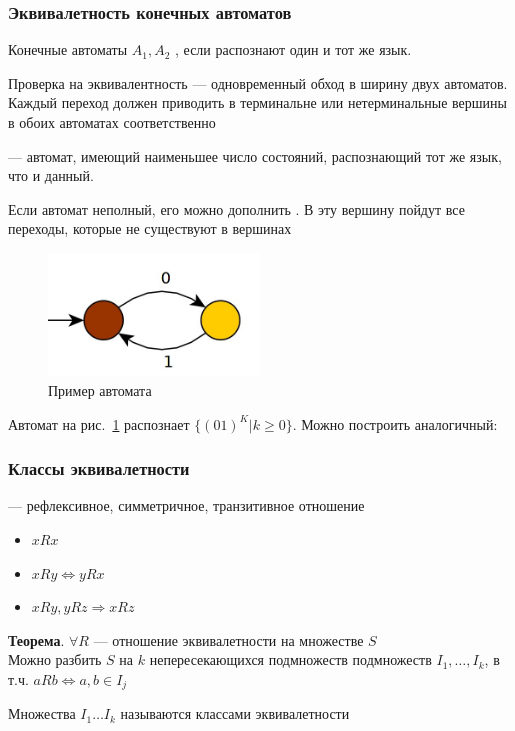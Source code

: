 \documentclass[a4paper, 14pt]{extarticle}
\begin{document}
\subsubsection{Эквивалетность конечных автоматов}
Конечные автоматы $A_1, A_2$ , если распознают один и тот же язык.

Проверка на эквивалентность --- одновременный обход в ширину двух автоматов. Каждый переход должен приводить в терминальне или нетерминальные вершины в обоих автоматах соответственно

 --- автомат, имеющий наименьшее число состояний, распознающий тот же язык, что и данный. 

Если автомат неполный, его можно дополнить . В эту вершину пойдут все переходы, которые не существуют в вершинах  

\begin{figure}[h]
    \centering
    \includegraphics[width=0.5\textwidth]{./img/L2/S001.jpg}
    \caption{Пример автомата}%
    \label{img:l2:1}
\end{figure}
Автомат на рис.~\ref{img:l2:1} распознает $\{ {(01)}^K | k \ge 0 \}$. Можно построить аналогичный:

\subsubsection{Классы эквивалетности}
 --- рефлексивное, симметричное, транзитивное отношение
\begin{itemize}
    \item $xRx$
    \item $xRy \Longleftrightarrow yRx$
    \item $xRy, yRz \Rightarrow xRz$
\end{itemize}

\begin{tcolorbox}
    \textbf{Теорема}. $\forall R$ --- отношение эквивалетности на множестве $S$\\
    Можно разбить $S$ на $k$ непересекающихся подмножеств подмножеств $I_1, \ldots, I_k$, в т.ч. $aRb \Longleftrightarrow a, b \in I_j$
\end{tcolorbox}
Множества $I_1 \ldots I_k$ называются классами эквивалетности
\end{document}

